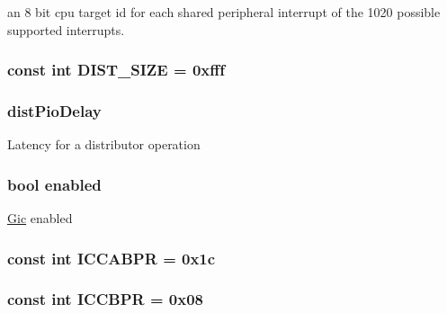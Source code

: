 \label{classPl390_aedf9bee3143d433dfabe7bc84f574df6}
an 8 bit cpu target id for each shared peripheral interrupt of the 1020 possible supported interrupts. \hypertarget{classPl390_a0a6bf9b44fc240861af4c98cb13b212b}{
\subsubsection[{DIST\_\-SIZE}]{\setlength{\rightskip}{0pt plus 5cm}const int {\bf DIST\_\-SIZE} = 0xfff}}
\label{classPl390_a0a6bf9b44fc240861af4c98cb13b212b}
\hypertarget{classPl390_ab55f6a058ccebacb16d2032b086703af}{
\subsubsection[{distPioDelay}]{ {\bf distPioDelay}}}
\label{classPl390_ab55f6a058ccebacb16d2032b086703af}
Latency for a distributor operation \hypertarget{classPl390_a8740ba80e30dd75e71d09fa1dcf04f3d}{
\subsubsection[{enabled}]{\setlength{\rightskip}{0pt plus 5cm}bool {\bf enabled}}}
\label{classPl390_a8740ba80e30dd75e71d09fa1dcf04f3d}
\hyperlink{namespaceGic}{Gic} enabled \hypertarget{classPl390_a0d8e9d466c4efc33cfd7dc2fd2eb59eb}{
\subsubsection[{ICCABPR}]{\setlength{\rightskip}{0pt plus 5cm}const int {\bf ICCABPR} = 0x1c}}
\label{classPl390_a0d8e9d466c4efc33cfd7dc2fd2eb59eb}
\hypertarget{classPl390_ace280dd5776899099ebfe4f7b7bbc01f}{
\subsubsection[{ICCBPR}]{\setlength{\rightskip}{0pt plus 5cm}const int {\bf ICCBPR} = 0x08}}
